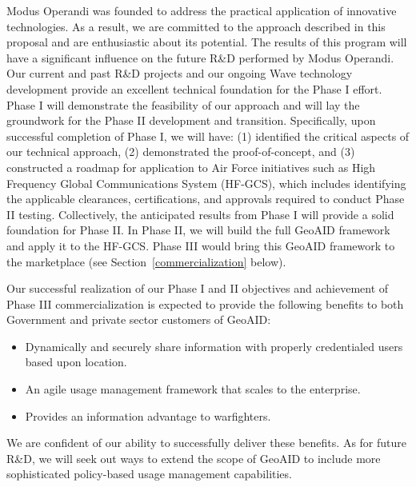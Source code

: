 \documentclass{sbir}
\begin{document}
Modus Operandi was founded to address the practical application of innovative technologies. As a result, we are committed to the approach described in this proposal and are enthusiastic about its potential. The results of this program will have a significant influence on the future R\&D performed by Modus Operandi. Our current and past R\&D projects and our ongoing Wave technology development provide an excellent technical foundation for the Phase I effort. Phase I will demonstrate the feasibility of our approach and will lay the groundwork for the Phase II development and transition. Specifically, upon successful completion of Phase I, we will have: (1) identified the critical aspects of our technical approach, (2) demonstrated the proof-of-concept, and (3) constructed a roadmap for application to Air Force initiatives such as High Frequency Global Communications System (HF-GCS), which includes identifying the applicable clearances, certifications, and approvals required to conduct Phase II testing. Collectively, the anticipated results from Phase I will provide a solid foundation for Phase II. In Phase II, we will build the full GeoAID framework and apply it to the HF-GCS. Phase III would bring this GeoAID framework to the marketplace (see Section~\ref{commercialization} below).

Our successful realization of our Phase I and II objectives and achievement of Phase III commercialization is expected to provide the following benefits to both Government and private sector customers of GeoAID:
\begin{itemize}
     \item Dynamically and securely share information with properly credentialed users based upon location.
     \item An agile usage management framework that scales to the enterprise.
     \item Provides an information advantage to warfighters.
\end{itemize}
We are confident of our ability to successfully deliver these benefits. As for future R\&D, we will seek out ways to extend the scope of GeoAID to include more sophisticated policy-based usage management capabilities.

\label{commercialization}
\end{document}
